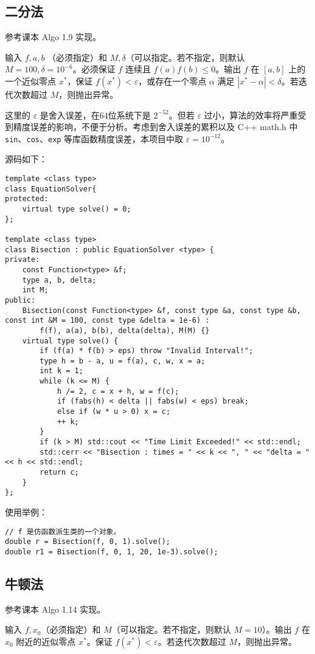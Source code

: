 \documentclass{ctexart}
\begin{document}
\subsection{二分法}
参考课本 Algo 1.9 实现。

输入 $f,a,b$ （必须指定）和 $M,\delta$（可以指定。若不指定，则默认 $M=100,\delta=10^{-6}$。必须保证 $f$ 连续且 $f(a)f(b)\leq 0$。输出 $f$ 在 $[a,b]$ 上的一个近似零点 $x^*$，保证 $f(x^*)<\varepsilon$，或存在一个零点 $\alpha$ 满足 $|x^*-\alpha|<\delta$。若迭代次数超过 $M$，则抛出异常。

这里的 $\varepsilon$ 是舍入误差，在64位系统下是 $2^{-52}$。但若 $\varepsilon$ 过小，算法的效率将严重受到精度误差的影响，不便于分析。考虑到舍入误差的累积以及 C++ math.h 中 \verb|sin|、\verb|cos|、\verb|exp| 等库函数精度误差，本项目中取 $\varepsilon=10^{-12}$。

源码如下：
\begin{verbatim}
template <class type>
class EquationSolver{
protected:
    virtual type solve() = 0;
};

template <class type>
class Bisection : public EquationSolver <type> {
private:
    const Function<type> &f;
    type a, b, delta;
    int M;
public:
    Bisection(const Function<type> &f, const type &a, const type &b, const int &M = 100, const type &delta = 1e-6) :
        f(f), a(a), b(b), delta(delta), M(M) {}
    virtual type solve() {
        if (f(a) * f(b) > eps) throw "Invalid Interval!";
        type h = b - a, u = f(a), c, w, x = a;
        int k = 1;
        while (k <= M) {
            h /= 2, c = x + h, w = f(c);
            if (fabs(h) < delta || fabs(w) < eps) break;
            else if (w * u > 0) x = c;
            ++ k;
        }
        if (k > M) std::cout << "Time Limit Exceeded!" << std::endl;
        std::cerr << "Bisection : times = " << k << ", " << "delta = " << h << std::endl;
        return c;
    }
};
\end{verbatim}

使用举例：
\begin{verbatim}
// f 是仿函数派生类的一个对象。
double r = Bisection(f, 0, 1).solve();
double r1 = Bisection(f, 0, 1, 20, 1e-3).solve();
\end{verbatim}

\subsection{牛顿法}
参考课本 Algo 1.14 实现。

输入 $f,x_0$（必须指定）和 $M$（可以指定。若不指定，则默认 $M=10$）。输出 $f$ 在 $x_0$ 附近的近似零点 $x^*$。保证 $f(x^*)<\varepsilon$。若迭代次数超过 $M$，则抛出异常。
\end{document}
